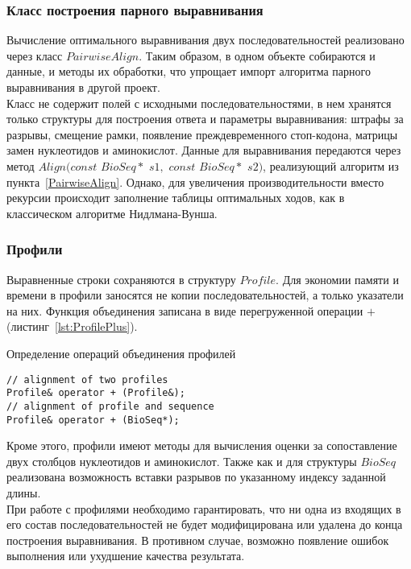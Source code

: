 \subsubsection[Класс построения парного выравнивания]{\large Класс построения парного выравнивания}
\hspace{\parindent} Вычисление оптимального выравнивания двух последовательностей реализовано через  класс $PairwiseAlign$. Таким образом, в одном объекте собираются и данные, и методы их обработки, что упрощает импорт алгоритма парного выравнивания в другой проект.\\
\indent Класс не содержит полей с исходными последовательностями, в нем хранятся только структуры для построения ответа и параметры выравнивания: штрафы за разрывы, смещение рамки, появление преждевременного стоп-кодона, матрицы замен нуклеотидов и аминокислот. Данные для выравнивания передаются через метод $Align(const$ $BioSeq*$ $s1,$ $const$ $BioSeq*$ $s2)$, реализующий алгоритм из пункта~\ref{PairwiseAlign}. Однако, для увеличения производительности вместо рекурсии происходит заполнение таблицы оптимальных ходов, как в классическом алгоритме Нидлмана-Вунша.

\subsubsection[Профили]{\large Профили}
\hspace{\parindent} Выравненные строки сохраняются в структуру $Profile$. Для экономии памяти и времени в профили заносятся не копии последовательностей, а только указатели на них. Функция объединения записана в виде перегруженной операции $+$ (листинг~\ref{lst:ProfilePlus}).
\begin{algorithm}
	\caption{Определение операций объединения профилей} \label{lst:ProfilePlus}
	\begin{lstlisting}
// alignment of two profiles
Profile& operator + (Profile&);
// alignment of profile and sequence
Profile& operator + (BioSeq*);
	\end{lstlisting}
\end{algorithm}

Кроме этого, профили имеют методы для вычисления оценки за сопоставление двух столбцов нуклеотидов и аминокислот. Также как и для структуры $BioSeq$ реализована возможность вставки разрывов по указанному индексу заданной длины.\\
\indent При работе с профилями необходимо гарантировать, что ни одна из входящих в его состав последовательностей не будет модифицирована или удалена до конца построения выравнивания. В противном случае, возможно появление ошибок выполнения или ухудшение качества результата. 

